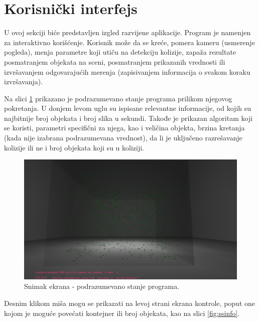\documentclass[12pt,oneside]{memoir}
\begin{document}
\section{Korisnički interfejs}

U ovoj sekciji biće predstavljen izgled razvijene aplikacije. 
Program je namenjen za interaktivno korišćenje. 
Korisnik može da se kreće, pomera kameru (usmerenje pogleda), menja parametre koji utiču na detekciju kolizije,
zapaža rezultate posmatranjem objekata na sceni, posmatranjem prikazanih vrednosti ili izvršavanjem odgovarajućih merenja
(zapisivanjem informacija o svakom koraku izvršavanja).

Na slici \ref{fig:ssdefault} prikazano je podrazumevano stanje programa prilikom njegovog pokretanja.
U donjem levom uglu su ispisane relevantne informacije, od kojih su najbitnije broj objekata 
i broj slika u sekundi. Takođe je prikazan algoritam koji se koristi, parametri specifični za njega, kao 
i veličina objekta, brzina kretanja (kada nije izabrana podrazumevana vrednost),  da li je uključeno razrešavanje kolizije ili ne  i
broj objekata koji su u koliziji.

\begin{figure}[h!]
	\centerfloat
	\includegraphics[scale=0.3]{ssdefault.png}
	\caption{Snimak ekrana - podrazumevano stanje programa.}
	\label{fig:ssdefault}
\end{figure}

\noindent Desnim klikom miša mogu se prikazati 
na levoj strani ekrana kontrole,
poput one kojom je moguće povećati kontejner ili broj objekata, kao na slici \ref{fig:ssinfo}.
\end{document}
